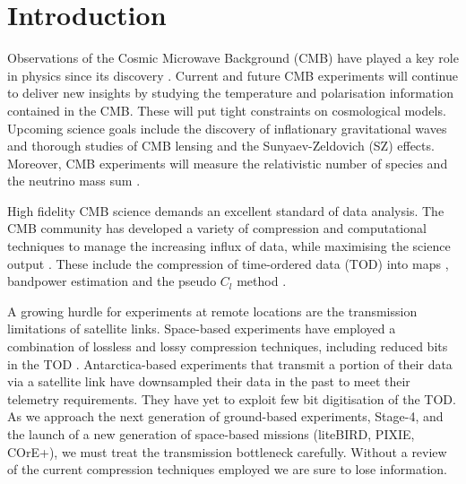 \documentclass[apj]{emulateapj}
\begin{document}
\section{Introduction}
\label{sec:intro}

Observations of the Cosmic Microwave Background (CMB) have played a key role in physics since its discovery \citep{penzias1965}. Current and future CMB experiments will continue to deliver new insights by studying the temperature and polarisation information contained in the CMB. These will put tight constraints on cosmological models. Upcoming science goals include the discovery of inflationary gravitational waves and thorough studies of CMB lensing and the Sunyaev-Zeldovich (SZ) effects. Moreover, CMB experiments will measure the relativistic number of species and the neutrino mass sum \citep{s4sciencebook}.


High fidelity CMB science demands an excellent standard of data analysis. The CMB community has developed a variety of compression and computational techniques to manage the increasing influx of data, while maximising the science output \citep{tristam2007}. These include the compression of time-ordered data (TOD) into maps \citep{tegmark1997}, bandpower estimation \citep{tegmark1998} and the pseudo $C_l$ method \citep{brown2005}.

A growing hurdle for experiments at remote locations are the transmission limitations of satellite links. Space-based experiments have employed a combination of lossless and lossy compression techniques, including reduced bits in the TOD \citep{gaztanaga1998, maris2003}. Antarctica-based experiments that transmit a portion of their data via a satellite link have downsampled their data in the past to meet their telemetry requirements. They have yet to exploit few bit digitisation of the TOD. As we approach the next generation of ground-based experiments, Stage-4, and the launch of a new generation of space-based missions (liteBIRD, PIXIE, COrE+), we must treat the transmission bottleneck carefully. Without a review of the current compression techniques employed we are sure to lose information.
\end{document}
